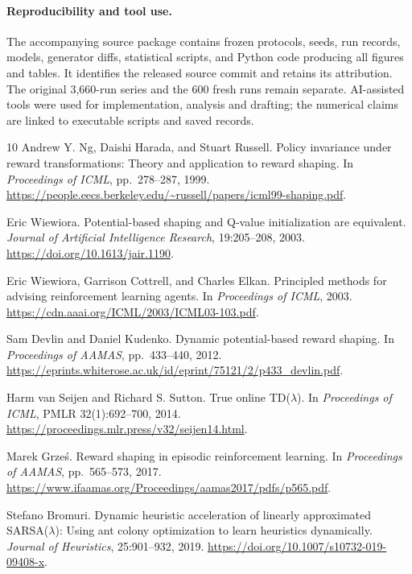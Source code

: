 \documentclass[10pt,twocolumn,letterpaper]{article}
\begin{document}
\paragraph{Reproducibility and tool use.}
The accompanying source package contains frozen protocols, seeds, run records, models, generator diffs, statistical scripts, and Python code producing all figures and tables. It identifies the released source commit and retains its attribution. The original 3,660-run series and the 600 fresh runs remain separate. AI-assisted tools were used for implementation, analysis and drafting; the numerical claims are linked to executable scripts and saved records.

\clearpage
\balance
\begin{thebibliography}{10}
Andrew Y. Ng, Daishi Harada, and Stuart Russell.
Policy invariance under reward transformations: Theory and application to reward shaping.
In \emph{Proceedings of ICML}, pp.~278--287, 1999.
\url{https://people.eecs.berkeley.edu/~russell/papers/icml99-shaping.pdf}.

Eric Wiewiora.
Potential-based shaping and Q-value initialization are equivalent.
\emph{Journal of Artificial Intelligence Research}, 19:205--208, 2003.
\url{https://doi.org/10.1613/jair.1190}.

Eric Wiewiora, Garrison Cottrell, and Charles Elkan.
Principled methods for advising reinforcement learning agents.
In \emph{Proceedings of ICML}, 2003.
\url{https://cdn.aaai.org/ICML/2003/ICML03-103.pdf}.

Sam Devlin and Daniel Kudenko.
Dynamic potential-based reward shaping.
In \emph{Proceedings of AAMAS}, pp.~433--440, 2012.
\url{https://eprints.whiterose.ac.uk/id/eprint/75121/2/p433_devlin.pdf}.

Harm van Seijen and Richard S. Sutton.
True online TD($\lambda$).
In \emph{Proceedings of ICML}, PMLR 32(1):692--700, 2014.
\url{https://proceedings.mlr.press/v32/seijen14.html}.

Marek Grze\'s.
Reward shaping in episodic reinforcement learning.
In \emph{Proceedings of AAMAS}, pp.~565--573, 2017.
\url{https://www.ifaamas.org/Proceedings/aamas2017/pdfs/p565.pdf}.

Stefano Bromuri.
Dynamic heuristic acceleration of linearly approximated SARSA($\lambda$): Using ant colony optimization to learn heuristics dynamically.
\emph{Journal of Heuristics}, 25:901--932, 2019.
\url{https://doi.org/10.1007/s10732-019-09408-x}.


\end{thebibliography}
\end{document}
